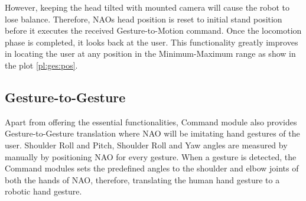 However, keeping the head tilted with mounted camera will cause the robot to lose balance. Therefore, NAOs head position is reset to initial stand position before it executes the received Gesture-to-Motion command. Once the locomotion phase is completed, it looks back at the user. This functionality greatly improves in locating the user at any position in the Minimum-Maximum range as show in the plot \ref{pl:ges:pos}.

\subsection{Gesture-to-Gesture} Apart from offering the essential functionalities, Command module also provides Gesture-to-Gesture translation where NAO will be imitating hand gestures of the user. Shoulder Roll and Pitch, Shoulder Roll and Yaw angles are measured by manually by positioning NAO for every gesture. When a gesture is detected, the Command modules sets the predefined angles to the shoulder and elbow joints of both the hands of NAO, therefore, translating the human hand gesture to a robotic hand gesture.
